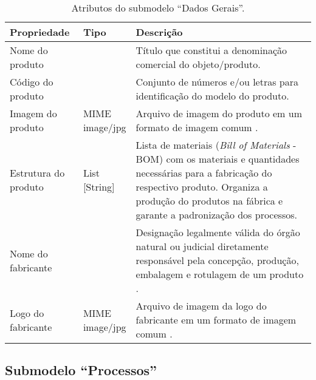 \begin{table}[htb]
	\centering
	\caption{Atributos do submodelo ``Dados Gerais''.}
	\begin{tabular}{p{3.5cm}p{1.5cm}p{9cm}}
		\hline
		\textbf{Propriedade}
		 & \textbf{Tipo}
		 & \textbf{Descrição}                                                                                                                                                                                                           \\

		\hline
		Nome do produto
		 & \makecell{String}
		 & Título que constitui a denominação comercial do objeto/produto.
		\\

		\hline
		Código do produto
		 & \makecell{String}
		 & Conjunto de números e/ou letras para identificação do modelo do produto.
		\\

		\hline
		Imagem do produto
		 & \makecell{MIME\\{image/jpg}}
		 & Arquivo de imagem do produto em um formato de imagem comum \cite{bader2020submodel}.
		\\

		\hline
		Estrutura do produto
		 & \makecell{List\\{[String]}}
		 & Lista de materiais (\textit{Bill of Materials} - BOM) com os materiais e quantidades necessárias para a fabricação do respectivo produto. Organiza a produção do produtos na fábrica e garante a padronização dos processos. \\


		\hline
		Nome do fabricante
		 & \makecell{String}
		 & Designação legalmente válida do órgão natural ou judicial diretamente responsável pela concepção, produção, embalagem e rotulagem de um produto \cite{bader2020submodel}.
		\\

		\hline
		Logo do fabricante
		 & \makecell{MIME\\{image/jpg}}
		 & Arquivo de imagem da logo do fabricante em um formato de imagem comum \cite{bader2020submodel}.
		\\

		\hline
	\end{tabular}
	\label{tab:submodelo-dados-gerais}
\end{table}

\subsection{Submodelo ``Processos''}

